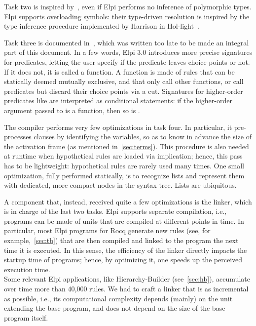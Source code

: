 \documentclass[a4paper, 11pt]{book}
\begin{document}
Task two is inspired by~\cite{10.5555/868728}, even if Elpi performs no
inference of polymorphic types. Elpi supports overloading symbols: their
type-driven resolution is inspired by the type inference procedure implemented
by Harrison in Hol-light~\cite{10.1007/978-3-642-03359-9_4}.


Task three is documented in~\cite{elpidet}, which was written too late to be
made an integral part of this document. In a few words, Elpi 3.0 introduces
more precise signatures for predicates, letting the user specify if the
predicate leaves choice points or not. If it does not, it is called a function.
A function is made of rules that can be statically deemed mutually exclusive,
and that only call other functions, or call predicates but discard their choice
points via a cut. Signatures for higher-order predicates like  are
interpreted as conditional statements: if the higher-order argument 
passed to  is a function, then so is .


The compiler performs very few optimizations in task four. In particular, it
pre-processes clauses by identifying the variables, so as to know in advance
the size of the activation frame (as mentioned in~\cref{sec:terms}). This
procedure is also needed at runtime when hypothetical rules are loaded via
implication; hence, this pass has to be lightweight: hypothetical rules are
rarely used many times. One small optimization, fully performed statically, is
to recognize lists and represent them with dedicated, more compact nodes in
the syntax tree. Lists are ubiquitous.


A component that, instead, received quite a few optimizations is the linker,
which is in charge of the last two tasks. Elpi supports separate compilation,
i.e., programs can be made of units that are compiled at different points in
time. In particular, most Elpi programs for Rocq generate new rules (see, for
example,~\cref{sec:tb}) that are then compiled and linked to the program the
next time it is executed. In this sense, the efficiency of the linker directly
impacts the startup time of programs; hence, by optimizing it, one speeds
up the perceived execution time.\\
Some relevant Elpi applications, like Hierarchy-Builder (see~\cref{sec:hb}),
accumulate over time more than 40,000 rules. We had to craft a linker that is
as incremental as possible, i.e., its computational complexity depends (mainly)
on the unit extending the base program, and does not depend on the size of the
base program itself.
\end{document}
